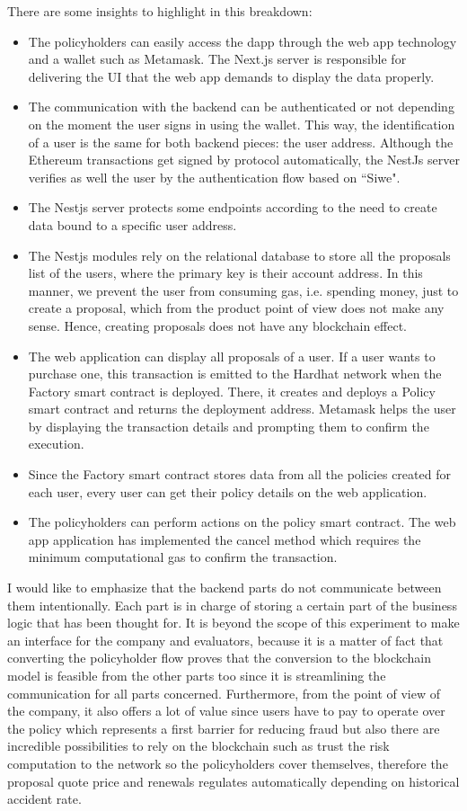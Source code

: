 {There are some insights to highlight in this breakdown:
\begin{itemize}
    \item The policyholders can easily access the dapp through the web app technology and a wallet such as Metamask. The Next.js server is responsible for delivering the UI that the web app demands to display the data properly.
    \item The communication with the backend can be authenticated or not depending on the moment the user signs in using the wallet. This way, the identification of a user is the same for both backend pieces: the user address. Although the Ethereum transactions get signed by protocol automatically, the NestJs server verifies as well the user by the authentication flow based on ``Siwe".
    \item The Nestjs server protects some endpoints according to the need to create data bound to a specific user address. 
    \item The Nestjs modules rely on the relational database to store all the proposals list of the users, where the primary key is their account address. In this manner, we prevent the user from consuming gas, i.e. spending money, just to create a proposal, which from the product point of view does not make any sense. Hence, creating proposals does not have any blockchain effect.
    \item The web application can display all proposals of a user. If a user wants to purchase one, this transaction is emitted to the Hardhat network when the Factory smart contract is deployed. There, it creates and deploys a Policy smart contract and returns the deployment address. Metamask helps the user by displaying the transaction details and prompting them to confirm the execution.
    \item Since the Factory smart contract stores data from all the policies created for each user, every user can get their policy details on the web application. 
    \item The policyholders can perform actions on the policy smart contract. The web app application has implemented the cancel method which requires the minimum computational gas to confirm the transaction.
\end{itemize}

I would like to emphasize that the backend parts do not communicate between them intentionally. Each part is in charge of storing a certain part of the business logic that has been thought for. It is beyond the scope of this experiment to make an interface for the company and evaluators, because it is a matter of fact that converting the policyholder flow proves that the conversion to the blockchain model is feasible from the other parts too since it is streamlining the communication for all parts concerned. Furthermore, from the point of view of the company, it also offers a lot of value since users have to pay to operate over the policy which represents a first barrier for reducing fraud but also there are incredible possibilities to rely on the blockchain such as trust the risk computation to the network so the policyholders cover themselves, therefore the proposal quote price and renewals regulates automatically depending on historical accident rate.
}

